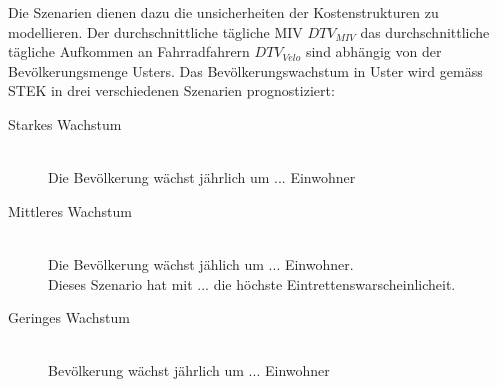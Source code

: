 %
%
%
%

\label{subsec:Szenarien}

Die Szenarien dienen dazu die unsicherheiten der Kostenstrukturen zu modellieren. Der durchschnittliche tägliche MIV $DTV_{MIV}$ das durchschnittliche tägliche  Aufkommen an Fahrradfahrern $DTV_{Velo}$ sind abhängig von der Bevölkerungsmenge Usters. Das Bevölkerungswachstum in Uster wird gemäss STEK in drei verschiedenen Szenarien prognostiziert:

\begin{description}
\item[Starkes Wachstum] \hfill \\
Die Bevölkerung wächst jährlich um ... Einwohner
\item[Mittleres Wachstum] \hfill \\
Die Bevölkerung wächst jählich um ... Einwohner. \\
Dieses Szenario hat mit ... die höchste Eintrettenswarscheinlicheit.
\item[Geringes Wachstum] \hfill \\
Bevölkerung wächst jährlich um ... Einwohner
\end{description}



%

